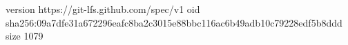 version https://git-lfs.github.com/spec/v1
oid sha256:09a7dfe31a672296eafc8ba2c3015e88bbc116ac6b49adb10c79228edf5b8ddd
size 1079
